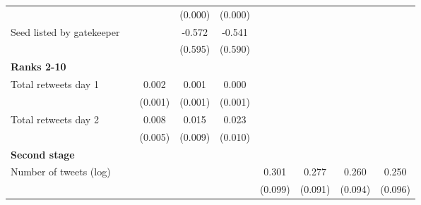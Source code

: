 {\begin{tabular}{l*{8}{c}}
                    &                     &                     &     (0.000)         &     (0.000)         &                     &                     &                     &                     \\
Seed listed by gatekeeper&                     &                     &      -0.572         &      -0.541         &                     &                     &                     &                     \\
                    &                     &                     &     (0.595)         &     (0.590)         &                     &                     &                     &                     \\
\textbf{Ranks 2-10} &                     &                     &                     &                     &                     &                     &                     &                     \\
Total retweets day 1&                     &       0.002\sym{**} &       0.001         &       0.000         &                     &                     &                     &                     \\
                    &                     &     (0.001)         &     (0.001)         &     (0.001)         &                     &                     &                     &                     \\
Total retweets day 2&                     &       0.008         &       0.015         &       0.023\sym{**} &                     &                     &                     &                     \\
                    &                     &     (0.005)         &     (0.009)         &     (0.010)         &                     &                     &                     &                     \\
\textbf{Second stage}&                     &                     &                     &                     &                     &                     &                     &                     \\
Number of tweets (log)&                     &                     &                     &                     &       0.301\sym{***}&       0.277\sym{***}&       0.260\sym{***}&       0.250\sym{***}\\
                    &                     &                     &                     &                     &     (0.099)         &     (0.091)         &     (0.094)         &     (0.096)         \\

\end{tabular}}
